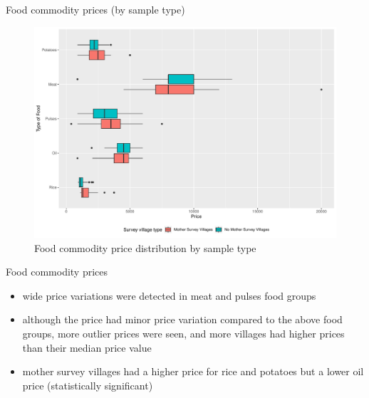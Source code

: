 \documentclass[
  ignorenonframetext,
]{beamer}
\providecommand{\tightlist}{%
  \setlength{\itemsep}{0pt}\setlength{\parskip}{0pt}}
\begin{document}
\begin{frame}{Food commodity prices (by sample type)}
\protect\hypertarget{food-commodity-prices-by-sample-type}{}
\begin{figure}
\includegraphics[width=1\linewidth]{example_plots_files/figure-beamer/unnamed-chunk-16-1} \caption{Food commodity price distribution by sample type}\label{fig:unnamed-chunk-16}
\end{figure}
\end{frame}

\begin{frame}{Food commodity prices}
\protect\hypertarget{food-commodity-prices}{}
\begin{itemize}
\tightlist
\item
  wide price variations were detected in meat and pulses food groups\\
\item
  although the price had minor price variation compared to the above
  food groups, more outlier prices were seen, and more villages had
  higher prices than their median price value\\
\item
  mother survey villages had a higher price for rice and potatoes but a
  lower oil price (statistically significant)
\end{itemize}
\end{frame}
\end{document}
